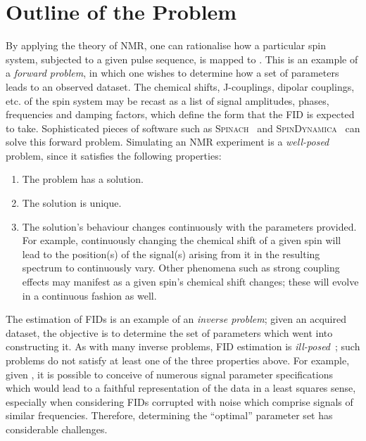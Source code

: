 \section{Outline of the Problem}
\label{sec:theory-outline}
By applying the theory of \ac{NMR}, one can
rationalise how a particular spin system, subjected to a given pulse sequence,
is mapped to . This is an example of a \emph{forward problem},
in which one wishes to determine how a set of parameters leads to an
observed dataset.
The chemical shifts, J-couplings, dipolar couplings, etc. of the spin system
may be recast as a list of signal amplitudes, phases, frequencies and
damping factors, which define the form that the \ac{FID} is expected to take.
Sophisticated pieces of software such as \textsc{Spinach}~\cite{Hogben2011} and
\textsc{SpinDynamica}~\cite{Bengs2018} can solve this forward problem.
Simulating an \ac{NMR} experiment is a \emph{well-posed} problem, since it
satisfies the following properties:
\begin{enumerate}
    \item The problem has a solution.
    \item The solution is unique.
    \item The solution's behaviour changes continuously with the parameters
        provided. For example, continuously changing the chemical shift of a
        given spin will lead to the position(s) of the signal(s) arising from
        it in the resulting spectrum to continuously vary. Other phenomena such
        as strong coupling effects may manifest as a given spin's chemical
        shift changes; these will evolve in a continuous fashion as well.
\end{enumerate}
The estimation of \acp{FID} is an example of an \emph{inverse problem};
given an acquired dataset, the objective is to determine the set of parameters
which went into constructing it.
As with many inverse problems, \ac{FID} estimation is
\emph{ill-posed}~\cite{Kabanikhin2008}; such problems do not satisfy at least
one of the three properties above. For example, given , it is possible
to conceive of numerous signal parameter specifications which would lead to a
faithful representation of the data in a least squares sense, especially when
considering \acp{FID} corrupted with noise which comprise signals of similar
frequencies. Therefore, determining the ``optimal'' parameter set has
considerable challenges.

